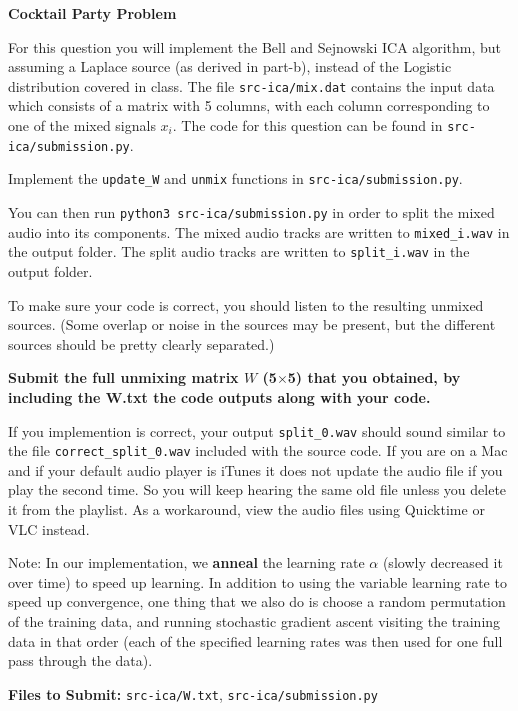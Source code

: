 \item {} \textbf{Cocktail Party Problem}

For this question you will implement the Bell and Sejnowski ICA algorithm, but
assuming a Laplace source (as derived in part-b), instead of the Logistic distribution
covered in class. The file \texttt{src-ica/mix.dat} contains the input data which consists of a matrix
with 5 columns, with each column corresponding to one of the mixed signals
$x_i$. The code for this question can be found in \texttt{src-ica/submission.py}.

Implement the \texttt{update\_W} and \texttt{unmix} functions in \texttt{src-ica/submission.py}.

You can then run \texttt{python3 src-ica/submission.py} in order to split the mixed audio into its components.
The mixed audio tracks are written to \texttt{mixed\_i.wav} in the output folder.
The split audio tracks are written to \texttt{split\_i.wav} in the output folder.

To make sure your code is correct, you should listen to the
resulting unmixed sources.  (Some overlap or noise in the sources may be present,
but the different sources should be pretty clearly separated.)

\textbf{Submit the full unmixing matrix $W$ (5$\times$5) that you obtained, by including the W.txt the code outputs along with your code.}

If you implemention is correct, your output \texttt{split\_0.wav} should sound similar to the file \texttt{correct\_split\_0.wav} included with the source code.
If you are on a Mac and if your default audio player is iTunes it does not update the audio file if you play the second time. 
So you will keep hearing the same old file unless you delete it from the playlist. 
As a workaround, view the audio files using Quicktime or VLC instead.

Note: In our implementation, we {\bf anneal} the learning rate $\alpha$
(slowly decreased it over time) to speed up learning. In addition to using the variable
learning rate to speed up convergence, one thing that we also do is
choose a random permutation of the training data, and running stochastic
gradient ascent visiting the training data in that order (each of the
specified learning rates was then used for one full pass through the data).

\textbf{Files to Submit: }\texttt{src-ica/W.txt}, \texttt{src-ica/submission.py}